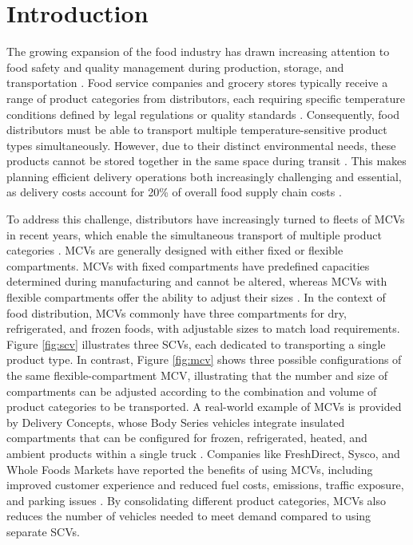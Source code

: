 \documentclass[11pt]{elsarticle}
\theoremstyle{plain}
\newcommand{\blue}[1]{#1}
\begin{document}
\setlength{\parskip}{1.5mm}
\onehalfspacing

\section{Introduction} \label{sec:introduction}

The growing expansion of the food industry has drawn increasing attention to food safety and quality management during production, storage, and transportation \citep{hsiao2017distribution}. Food service companies and grocery stores typically receive a range of product categories from distributors, each requiring specific temperature conditions defined by legal regulations or quality standards \citep{hertog2014shelf, OstermeierHübner2018}.
Consequently, food distributors must be able to transport multiple temperature-sensitive product types simultaneously. However, due to their distinct environmental needs, these products cannot be stored together in the same space during transit \citep{chen2019multi}.
This makes planning efficient delivery operations both increasingly challenging and essential, as delivery costs account for 20\% of overall food supply chain costs \citep{kuhn2013integrative}.

To address this challenge, distributors have increasingly turned to fleets of \acp{MCV} in recent years, which enable the simultaneous transport of multiple product categories \citep{ostermeier2021multi}.
\acp{MCV} are generally designed with either fixed or flexible compartments.  \acp{MCV} with fixed compartments have predefined capacities determined during manufacturing and cannot be altered, whereas \acp{MCV} with flexible compartments offer the ability to adjust their sizes \citep{henke2015multi}. 
In the context of food distribution, \acp{MCV} commonly have three compartments for dry, refrigerated, and frozen foods, with adjustable sizes to match load requirements.
\blue{Figure \ref{fig:scv} illustrates three \acp{SCV}, each dedicated to transporting a single product type. In contrast, Figure \ref{fig:mcv} shows three possible configurations of the same flexible-compartment \ac{MCV}, illustrating that the number and size of compartments can be adjusted according to the combination and volume of product categories to be transported. A real-world example of \acp{MCV} is provided by Delivery Concepts, whose Body Series vehicles integrate insulated compartments that can be configured for frozen, refrigerated, heated, and ambient products within a single truck \citep{deliveryconcepts}.}
Companies like FreshDirect, Sysco, and Whole Foods Markets have reported the benefits of using \acp{MCV}, including improved customer experience and reduced fuel costs, emissions, traffic exposure, and parking issues \citep{MultiTempLogistics2024}.
By consolidating different product categories, \acp{MCV} also reduces the number of vehicles needed to meet demand compared to using separate \acp{SCV}.
\end{document}
